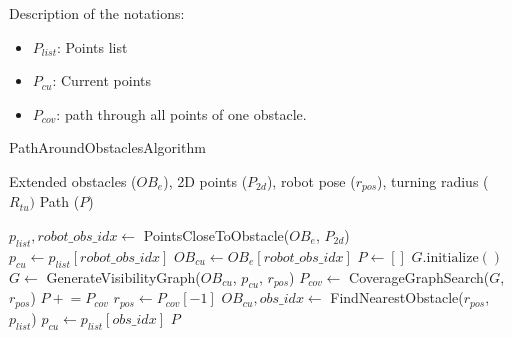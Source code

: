 Description of the notations:
\begin{itemize}[noitemsep,topsep=0pt]
    \item $P_{list}$: Points list
    \item $P_{cu}$: Current points
    \item $P_{cov}$: path through all points of one obstacle.  
\end{itemize}

\begin{algorithm}[H]     
    \caption{PathAroundObstaclesAlgorithm}  
    \label{alg:path_around_obstacles_algorithm}
    \begin{algorithmic}[1]
    \Require Extended obstacles ($OB_e$), 2D points ($P_{2d}$), robot pose ($r_{pos}$), turning radius ($R_{tu}) $
    \Ensure Path ($P$)

    \State $p_{list}, robot\_obs\_idx \leftarrow$ PointsCloseToObstacle($OB_e$, $P_{2d}$)
    \State $p_{cu} \leftarrow p_{list}[robot\_obs\_idx]$    
    \State $OB_{cu} \leftarrow OB_e[robot\_obs\_idx]$
    \State $P \leftarrow []$
        \State $G.\text{initialize}()$
        \State $G \leftarrow$ GenerateVisibilityGraph($OB_{cu}$, $p_{cu}$, $r_{pos}$)
        \State $P_{cov} \leftarrow$ CoverageGraphSearch($G$, $r_{pos}$)
        \State $P \mathrel{+}= P_{cov}$
        \State $r_{pos} \leftarrow P_{cov}[-1]$
        \State $OB_{cu}, obs\_idx \leftarrow$ FindNearestObstacle($r_{pos}$, $p_{list}$)
        \State $p_{cu} \leftarrow p_{list}[obs\_idx]$
    \EndFor
    \State \Return $P$
    \end{algorithmic}
    \end{algorithm}



    

